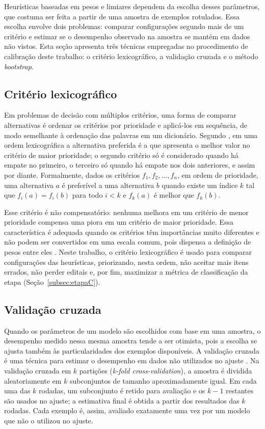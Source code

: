Heurísticas baseadas em pesos e limiares dependem da escolha desses parâmetros, que costuma ser feita a partir de uma amostra de exemplos rotulados. Essa escolha envolve dois problemas: comparar configurações segundo mais de um critério e estimar se o desempenho observado na amostra se mantém em dados não vistos. Esta seção apresenta três técnicas empregadas no procedimento de calibração deste trabalho: o critério lexicográfico, a validação cruzada e o método \textit{bootstrap}.

\subsection{Critério lexicográfico}
\label{subsec:ref_lexicografico}

Em problemas de decisão com múltiplos critérios, uma forma de comparar alternativas é ordenar os critérios por prioridade e aplicá-los em sequência, de modo semelhante à ordenação das palavras em um dicionário. Segundo , em uma ordem lexicográfica a alternativa preferida é a que apresenta o melhor valor no critério de maior prioridade; o segundo critério só é considerado quando há empate no primeiro, o terceiro só quando há empate nos dois anteriores, e assim por diante. Formalmente, dados os critérios $f_1, f_2, \ldots, f_n$, em ordem de prioridade, uma alternativa $a$ é preferível a uma alternativa $b$ quando existe um índice $k$ tal que $f_i(a) = f_i(b)$ para todo $i < k$ e $f_k(a)$ é melhor que $f_k(b)$.

Esse critério é não compensatório: nenhuma melhora em um critério de menor prioridade compensa uma piora em um critério de maior prioridade. Essa característica é adequada quando os critérios têm importâncias muito diferentes e não podem ser convertidos em uma escala comum, pois dispensa a definição de pesos entre eles \cite{fishburn1974}. Neste trabalho, o critério lexicográfico é usado para comparar configurações das heurísticas, priorizando, nesta ordem, não aceitar mais itens errados, não perder editais e, por fim, maximizar a métrica de classificação da etapa (Seção~\ref{subsec:etapaC}).

\subsection{Validação cruzada}
\label{subsec:ref_validacao_cruzada}

Quando os parâmetros de um modelo são escolhidos com base em uma amostra, o desempenho medido nessa mesma amostra tende a ser otimista, pois a escolha se ajusta também às particularidades dos exemplos disponíveis. A validação cruzada é uma técnica para estimar o desempenho em dados não utilizados no ajuste \cite{kohavi1995}. Na validação cruzada em $k$ partições (\textit{k-fold cross-validation}), a amostra é dividida aleatoriamente em $k$ subconjuntos de tamanho aproximadamente igual. Em cada uma das $k$ rodadas, um subconjunto é retido para avaliação e os $k-1$ restantes são usados no ajuste; a estimativa final é obtida a partir dos resultados das $k$ rodadas. Cada exemplo é, assim, avaliado exatamente uma vez por um modelo que não o utilizou no ajuste.


